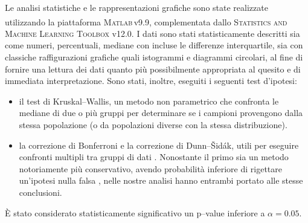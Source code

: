 Le analisi statistiche e le rappresentazioni grafiche sono state realizzate utilizzando la piattaforma \textsc{Matlab}\textsuperscript{\tiny\sffamily\textregistered}\!\,v9.9, complementata dallo \textsc{Statistics and Machine Learning Toolbox} v12.0. I dati sono stati statisticamente descritti sia come numeri, percentuali, mediane con incluse le differenze interquartile, sia con classiche raffigurazioni grafiche quali istogrammi e diagrammi circolari, al fine di fornire una lettura dei dati quanto più possibilmente appropriata al quesito e di immediata interpretazione. Sono stati, inoltre, eseguiti i seguenti test d'ipotesi:

\begin{itemize}
    \item il test di Kruskal--Wallis, un metodo non parametrico che confronta le mediane di due o più gruppi per determinare se i campioni provengono dalla stessa popolazione (o da popolazioni diverse con la stessa distribuzione).
    \item la correzione di Bonferroni e la correzione di Dunn--Šidák, utili per eseguire confronti multipli tra gruppi di dati \cite{review_multiple_comparisons}. Nonostante il primo sia un metodo notoriamente più conservativo, avendo probabilità inferiore di rigettare un'ipotesi nulla falsa \cite{Farewell_Bonferroni,Rejecting_Bonferroni}, nelle nostre analisi hanno entrambi portato alle stesse conclusioni. 
    
    
    
\end{itemize}

\`E stato considerato statisticamente significativo un p--value inferiore a $\alpha = 0.05$.

\bigskip

